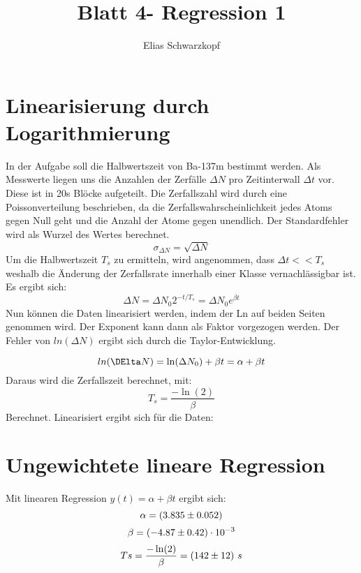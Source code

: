 \documentclass[11pt]{article}
\begin{document}
    \author{Elias Schwarzkopf}
    \title{Blatt 4- Regression 1}

    \maketitle

    \section{Linearisierung durch Logarithmierung}

   In der Aufgabe soll die Halbwertszeit von Ba-137m bestimmt werden. Als Messwerte liegen uns die Anzahlen der Zerfälle {$\Delta N$} pro Zeitinterwall {$\Delta t$} vor. Diese ist in 20s Blöcke aufgeteilt.
    Die Zerfallszahl wird durch eine Poissonverteilung beschrieben, da die Zerfallswahrscheinlichkeit jedes Atoms gegen Null geht und die Anzahl der Atome gegen unendlich. Der Standardfehler wird als Wurzel des Wertes berechnet.
    \begin{equation*}
        \sigma_{\Delta N} = \sqrt {\Delta N}
    \end{equation*}
    Um die Halbwertszeit  $T_s$ zu ermitteln, wird angenommen, dass  $\Delta t << T_s$ weshalb die Änderung der Zerfallsrate innerhalb einer Klasse vernachlässigbar ist. Es ergibt sich:
    \begin{equation*}
        \Delta N = \Delta N_0 2^{-t / T_s} = \Delta N_0 e^{\beta t}
    \end{equation*}
    Nun können die Daten linearisiert werden, indem der Ln auf beiden Seiten genommen wird. Der Exponent kann dann als Faktor vorgezogen werden. Der Fehler von $ln(\Delta N)$ ergibt sich durch die Taylor-Entwicklung.
    
    \begin{equation*}
        ln(\DElta N) = \ln(\Delta N_0)+\beta t = \alpha + \beta t
    \end{equation*}
    Daraus wird die Zerfallszeit berechnet, mit:
    \begin{equation*}
       T_s =\frac{-\ln(2)}{\beta}
        \end{equation*}
    Berechnet.
    Linearisiert ergibt sich für die Daten:
    
    \pagebreak
   

    \section{Ungewichtete lineare Regression}
    Mit linearen Regression $y(t) = \alpha + \beta t$ ergibt sich:
    \begin{equation*}
        \alpha = (3.835 \pm 0.052)
    \end{equation*}
    \begin{equation*}
        \beta = (-4.87 \pm 0.42) \cdot 10^{-3}
    \end{equation*}
    \begin{equation*}
        Ts =\frac{-\ln(2)}{\beta}= (142 \pm 12)\ s
    \end{equation*}
\end{document}

